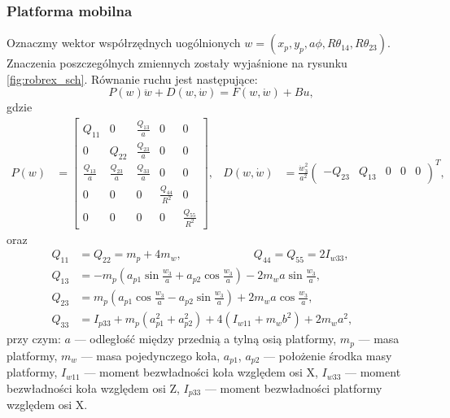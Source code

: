 \subsubsection{Platforma mobilna}
Oznaczmy wektor współrzędnych uogólnionych $w=(x_p, y_p, a\phi, R\theta_14, R\theta_23)$. Znaczenia poszczególnych zmiennych zostały wyjaśnione na rysunku \ref{fig:robrex_sch}. Równanie ruchu jest następujące:
\begin{equation}
P(w)\ddot w + D(w, \dot w) = F(w, \dot w) + Bu,
\end{equation}
gdzie
\begin{align}
P(w) &= \begin{bmatrix}
Q_{11} & 0 & \frac{Q_{13}}{a} & 0 & 0\\
0 & Q_{22} & \frac{Q_{23}}{a} & 0 & 0\\
\frac{Q_{13}}{a} & \frac{Q_{23}}{a} & \frac{Q_{33}}{a} & 0 & 0\\
0 & 0 & 0 & \frac{Q_{44}}{R^2} & 0 \\
0 & 0 & 0 & 0 & \frac{Q_{55}}{R^2}
\end{bmatrix}, & 
D(w, \dot w) &= \frac{\dot w_3^2}{a^2}\begin{pmatrix}
-Q_{23} & Q_{13} & 0 & 0 & 0
\end{pmatrix}^T,
\end{align}
oraz
\begin{align}
Q_{11} &= Q_{22} = m_p+4m_w, \phantom{xxxxxxxxxxx} Q_{44} = Q_{55} = 2I_{w33},\\
Q_{13} &= -m_p(a_{p1}\sin\frac{w_3}{a}+a_{p2}\cos\frac{w_3}{a})- 2m_wa\sin\frac{w_3}{a}, & &\\
Q_{23} &=  m_p(a_{p1}\cos\frac{w_3}{a}-a_{p2}\sin\frac{w_3}{a})+ 2m_wa\cos\frac{w_3}{a}, & &\\
Q_{33} &= I_{p33}+m_p(a_{p1}^2+a_{p2}^2)+4(I_{w11}+m_wb^2)+2m_wa^2,
\end{align}
przy czym:
$a$ --- odległość między przednią a tylną osią platformy,
$m_p$ --- masa platformy,
$m_w$ --- masa pojedynczego koła,
$a_{p1}$, $a_{p2}$ --- położenie środka masy platformy,
$I_{w11}$ --- moment bezwładności koła względem osi X,
$I_{w33}$ --- moment bezwładności koła względem osi Z,
$I_{p33}$ --- moment bezwładności platformy względem osi X.

